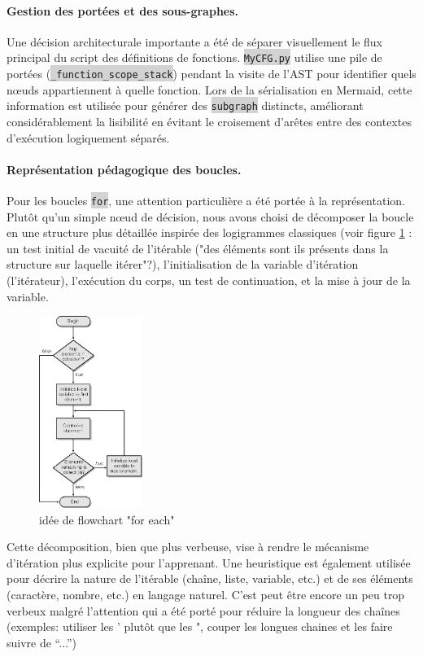 \documentclass[11pt,a4paper]{article}
\newcommand{\code}[1]{\colorbox{lightgray}{\texttt{\small #1}}}
\begin{document}
\paragraph{Gestion des portées et des sous-graphes.} Une décision architecturale importante a été de séparer visuellement le flux principal du script des définitions de fonctions. \code{MyCFG.py} utilise une pile de portées (\code{\_function\_scope\_stack}) pendant la visite de l'AST pour identifier quels nœuds appartiennent à quelle fonction. Lors de la sérialisation en Mermaid, cette information est utilisée pour générer des \code{subgraph} distincts, améliorant considérablement la lisibilité en évitant le croisement d'arêtes entre des contextes d'exécution logiquement séparés.

\paragraph{Représentation pédagogique des boucles.} Pour les boucles \code{for}, une attention particulière a été portée à la représentation. Plutôt qu'un simple nœud de décision, nous avons choisi de décomposer la boucle en une structure plus détaillée inspirée des logigrammes classiques (voir figure \ref{foreach_flowchart} : un test initial de vacuité de l'itérable ("des éléments sont ils présents dans la structure sur laquelle itérer"?), l'initialisation de la variable d'itération (l'itérateur), l'exécution du corps, un test de continuation, et la mise à jour de la variable. 
\begin{figure}[H]
    \centering
    \includegraphics[width=0.3\textwidth]{FqKSJ.jpg}
    \caption{idée de flowchart "for each" \cite{FqKSJ.jpg}}
    \label{foreach_flowchart}
\end{figure}

Cette décomposition, bien que plus verbeuse, vise à rendre le mécanisme d'itération plus explicite pour l'apprenant. Une heuristique est également utilisée pour décrire la nature de l'itérable (chaîne, liste, variable, etc.) et de ses éléments (caractère, nombre, etc.) en langage naturel. C'est peut être encore un peu trop verbeux malgré l'attention qui a été porté pour réduire la longueur des chaînes (exemples: utiliser les ' plutôt que les ", couper les longues chaines et les faire suivre de ``...'')
\end{document}
